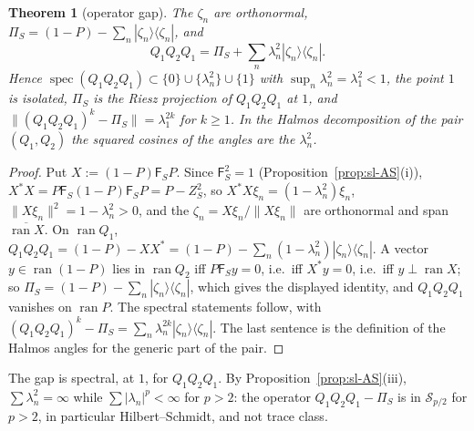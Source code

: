 \documentclass[11pt]{amsart}
\newtheorem{theorem}{Theorem}[section]
\theoremstyle{definition}
\theoremstyle{remark}
\begin{document}
\begin{theorem}[operator gap]\label{thm:sl-gap}
The $\zeta_n$ are orthonormal, $\Pi_S=(1-P)-\sum_n|\zeta_n\rangle\langle\zeta_n|$, and
\[
Q_1Q_2Q_1=\Pi_S+\sum_n\lambda_n^2|\zeta_n\rangle\langle\zeta_n| .
\]
Hence $\operatorname{spec}(Q_1Q_2Q_1)\subset\{0\}\cup\{\lambda_n^2\}\cup\{1\}$ with $\sup_n\lambda_n^2=\lambda_1^2<1$, the point $1$ is isolated,
$\Pi_S$ is the Riesz projection of $Q_1Q_2Q_1$ at $1$, and $\|(Q_1Q_2Q_1)^k-\Pi_S\|=\lambda_1^{2k}$ for $k\ge1$. In the Halmos
decomposition of the pair $(Q_1,Q_2)$ the squared cosines of the angles are the $\lambda_n^2$.
\end{theorem}
\begin{proof}
Put $X:=(1-P)\mathsf F_SP$. Since $\mathsf F_S^2=1$ (Proposition~\ref{prop:sl-AS}(i)),
$X^*X=P\mathsf F_S(1-P)\mathsf F_SP=P-Z_S^2$, so $X^*X\xi_n=(1-\lambda_n^2)\xi_n$, $\|X\xi_n\|^2=1-\lambda_n^2>0$, and the
$\zeta_n=X\xi_n/\|X\xi_n\|$ are orthonormal and span $\overline{\operatorname{ran}X}$. On $\operatorname{ran}Q_1$,
$Q_1Q_2Q_1=(1-P)-XX^*=(1-P)-\sum_n(1-\lambda_n^2)|\zeta_n\rangle\langle\zeta_n|$. A vector $y\in\operatorname{ran}(1-P)$ lies in
$\operatorname{ran}Q_2$ iff $P\mathsf F_Sy=0$, i.e.\ iff $X^*y=0$, i.e.\ iff $y\perp\operatorname{ran}X$; so
$\Pi_S=(1-P)-\sum_n|\zeta_n\rangle\langle\zeta_n|$, which gives the displayed identity, and $Q_1Q_2Q_1$ vanishes on
$\operatorname{ran}P$. The spectral statements follow, with $(Q_1Q_2Q_1)^k-\Pi_S=\sum_n\lambda_n^{2k}|\zeta_n\rangle\langle\zeta_n|$. The
last sentence is the definition of the Halmos angles for the generic part of the pair.
\end{proof}
The gap is spectral, at $1$, for $Q_1Q_2Q_1$. By Proposition~\ref{prop:sl-AS}(iii), $\sum\lambda_n^2=\infty$ while
$\sum|\lambda_n|^p<\infty$ for $p>2$: the operator $Q_1Q_2Q_1-\Pi_S$ is in $\mathcal S_{p/2}$ for $p>2$, in particular
Hilbert--Schmidt, and not trace class.
\end{document}
